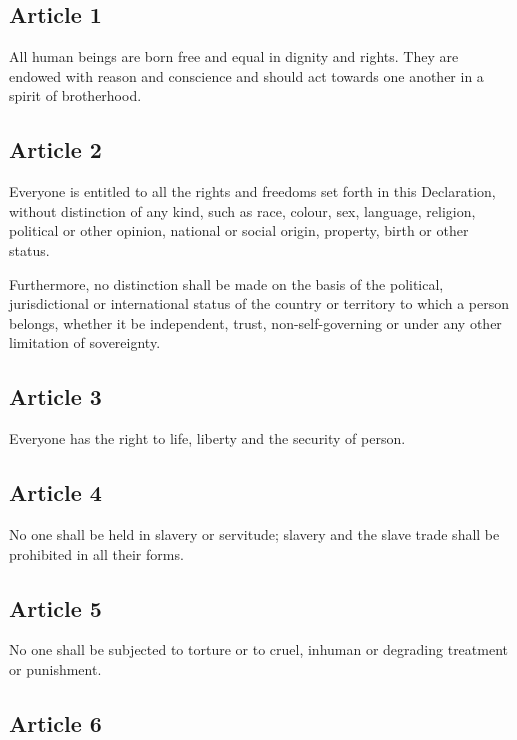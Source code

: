 \documentclass[
  titlepage,
  openright,
  DIV=calc,
  toc=listof,
  listof=nochaptergap]{scrbook}
\begin{document}
\subsection{Article 1}\label{article-1-2}

All human beings are born free and equal in dignity and rights. They are
endowed with reason and conscience and should act towards one another in
a spirit of brotherhood.

\subsection{Article 2}\label{article-2-2}

Everyone is entitled to all the rights and freedoms set forth in this
Declaration, without distinction of any kind, such as race, colour, sex,
language, religion, political or other opinion, national or social
origin, property, birth or other status.

Furthermore, no distinction shall be made on the basis of the political,
jurisdictional or international status of the country or territory to
which a person belongs, whether it be independent, trust,
non-self-governing or under any other limitation of sovereignty.

\subsection{Article 3}\label{article-3-2}

Everyone has the right to life, liberty and the security of person.

\subsection{Article 4}\label{article-4-2}

No one shall be held in slavery or servitude; slavery and the slave
trade shall be prohibited in all their forms.

\subsection{Article 5}\label{article-5-2}

No one shall be subjected to torture or to cruel, inhuman or degrading
treatment or punishment.

\subsection{Article 6}\label{article-6-2}
\end{document}
